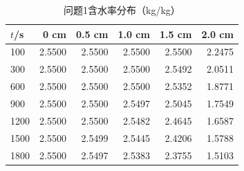 \begin{table}[!htbp]\centering
\caption{问题1含水率分布（kg/kg）}
\begin{tabular}{lrrrrr}\toprule
$t$/s & 0 cm & 0.5 cm & 1.0 cm & 1.5 cm & 2.0 cm\\\midrule
100 & 2.5500 & 2.5500 & 2.5500 & 2.5500 & 2.2475\\
300 & 2.5500 & 2.5500 & 2.5500 & 2.5492 & 2.0511\\
600 & 2.5500 & 2.5500 & 2.5500 & 2.5352 & 1.8771\\
900 & 2.5500 & 2.5500 & 2.5497 & 2.5045 & 1.7549\\
1200 & 2.5500 & 2.5500 & 2.5482 & 2.4645 & 1.6587\\
1500 & 2.5500 & 2.5499 & 2.5445 & 2.4206 & 1.5788\\
1800 & 2.5500 & 2.5497 & 2.5383 & 2.3755 & 1.5103\\
\bottomrule\end{tabular}\end{table}
